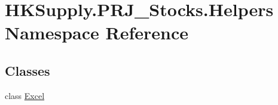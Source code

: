 \hypertarget{namespace_h_k_supply_1_1_p_r_j___stocks_1_1_helpers}{}\section{H\+K\+Supply.\+P\+R\+J\+\_\+\+Stocks.\+Helpers Namespace Reference}
\label{namespace_h_k_supply_1_1_p_r_j___stocks_1_1_helpers}
\subsection*{Classes}
\begin{DoxyCompactItemize}
\item 
class \mbox{\hyperlink{class_h_k_supply_1_1_p_r_j___stocks_1_1_helpers_1_1_excel}{Excel}}
\end{DoxyCompactItemize}
